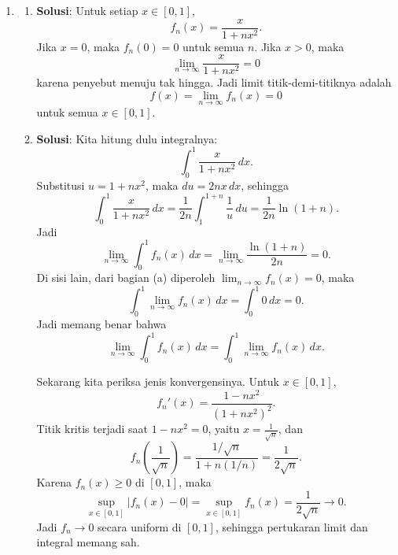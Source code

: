 \documentclass[11pt,letterpaper]{article}
\newcommand{\jawab}{\textbf{Solusi}:}
\begin{document}
\begin{enumerate}
  \item
        \begin{enumerate}[label=\alph*)]
          \item \jawab
                Untuk setiap $x \in [0,1]$,
                \[
                  f_n(x) = \frac{x}{1+nx^2}.
                \]
                Jika $x=0$, maka $f_n(0)=0$ untuk semua $n$.
                Jika $x>0$, maka
                \[
                  \lim_{n\to\infty} \frac{x}{1+nx^2} = 0
                \]
                karena penyebut menuju tak hingga.
                Jadi limit titik-demi-titiknya adalah
                \[
                  f(x) = \lim_{n\to\infty} f_n(x) = 0
                \]
                untuk semua $x \in [0,1]$.

          \item \jawab
                Kita hitung dulu integralnya:
                \[
                  \int_0^1 \frac{x}{1+nx^2}\,dx.
                \]
                Substitusi $u=1+nx^2$, maka $du=2nx\,dx$, sehingga
                \[
                  \int_0^1 \frac{x}{1+nx^2}\,dx
                  =
                  \frac{1}{2n}\int_1^{1+n} \frac{1}{u}\,du
                  =
                  \frac{1}{2n}\ln(1+n).
                \]
                Jadi
                \[
                  \lim_{n\to\infty}\int_0^1 f_n(x)\,dx
                  =
                  \lim_{n\to\infty}\frac{\ln(1+n)}{2n}
                  = 0.
                \]
                Di sisi lain, dari bagian (a) diperoleh $\lim_{n\to\infty}f_n(x)=0$, maka
                \[
                  \int_0^1 \lim_{n\to\infty} f_n(x)\,dx
                  =
                  \int_0^1 0\,dx
                  = 0.
                \]
                Jadi memang benar bahwa
                \[
                  \lim_{n\to\infty} \int_0^1 f_n(x)\,dx
                  =
                  \int_0^1 \lim_{n\to\infty} f_n(x)\,dx.
                \]

                Sekarang kita periksa jenis konvergensinya. Untuk $x \in [0,1]$,
                \[
                  f_n'(x)=\frac{1-nx^2}{(1+nx^2)^2}.
                \]
                Titik kritis terjadi saat $1-nx^2=0$, yaitu $x=\frac{1}{\sqrt{n}}$, dan
                \[
                  f_n\left(\frac{1}{\sqrt{n}}\right)
                  =
                  \frac{1/\sqrt{n}}{1+n(1/n)}
                  =
                  \frac{1}{2\sqrt{n}}.
                \]
                Karena $f_n(x)\ge 0$ di $[0,1]$, maka
                \[
                  \sup_{x\in[0,1]} |f_n(x)-0|
                  =
                  \sup_{x\in[0,1]} f_n(x)
                  =
                  \frac{1}{2\sqrt{n}}
                  \to 0.
                \]
                Jadi $f_n \to 0$ secara uniform di $[0,1]$, sehingga pertukaran limit dan integral memang sah.
        \end{enumerate}


\end{enumerate}
\end{document}
